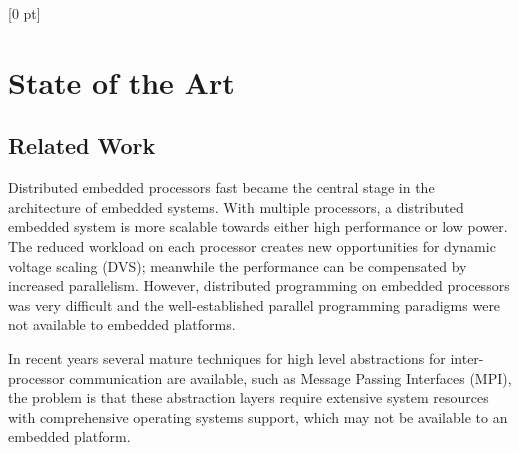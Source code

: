 \titlespacing{\chapter}{0 pt}{30 pt}{50 pt}[0 pt]
\titleformat{\section}{\Large\bfseries}{\thesection}{0 pt}{\hspace{30 pt}}
\titleformat{\subsection}{\large\bfseries}{\thesubsection}{0 pt}{\hspace{30 pt}}
\pagestyle{fancy}
\fancyhead[LO,LE]{\footnotesize\textit{\leftmark}}
\fancyhead[RO,RE]{\thepage}
\fancyfoot[CO,CE]{}

\chapter{State of the Art} %

\normalsize

\section{Related Work}
\noindent

Distributed embedded processors fast became the central stage in the
architecture of embedded systems. With multiple processors, a distributed
embedded system is more scalable towards either high performance or low
power. The reduced workload on each processor creates new opportunities for
dynamic voltage scaling (DVS); meanwhile the performance can be compensated by
increased parallelism. However, distributed programming on embedded processors
was very difficult and the well-established parallel programming paradigms
were not available to embedded platforms. 

In recent years several mature techniques for high level abstractions for
inter-processor communication are available, such as Message Passing Interfaces
(MPI), the problem is that these abstraction layers require extensive
system resources with comprehensive operating systems support, which may not be
available to an embedded platform.

